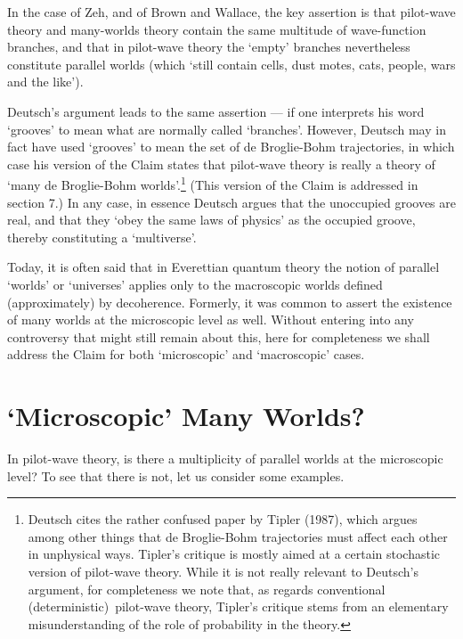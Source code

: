 \documentclass[12pt]{article}%
\begin{document}
In the case of Zeh, and of Brown and Wallace, the key assertion is that
pilot-wave theory and many-worlds theory contain the same multitude of
wave-function branches, and that in pilot-wave theory the `empty' branches
nevertheless constitute parallel worlds (which `still contain cells, dust
motes, cats, people, wars and the like').

Deutsch's argument leads to the same assertion --- if one interprets his word
`grooves' to mean what are normally called `branches'. However, Deutsch may in
fact have used `grooves' to mean the set of de Broglie-Bohm trajectories, in
which case his version of the Claim states that pilot-wave theory is really a
theory of `many de Broglie-Bohm worlds'.\footnote{Deutsch cites the rather
confused paper by Tipler (1987), which argues among other things that de
Broglie-Bohm trajectories must affect each other in unphysical ways. Tipler's
critique is mostly aimed at a certain stochastic version of pilot-wave theory.
While it is not really relevant to Deutsch's argument, for completeness we
note that, as regards conventional (deterministic)\ pilot-wave theory,
Tipler's critique stems from an elementary misunderstanding of the role of
probability in the theory.} (This version of the Claim is addressed in section
7.) In any case, in essence Deutsch argues that the unoccupied grooves are
real, and that they `obey the same laws of physics' as the occupied groove,
thereby constituting a `multiverse'.

Today, it is often said that in Everettian quantum theory the notion of
parallel `worlds' or `universes' applies only to the macroscopic worlds
defined (approximately) by decoherence. Formerly, it was common to assert the
existence of many worlds at the microscopic level as well. Without entering
into any controversy that might still remain about this, here for completeness
we shall address the Claim for both `microscopic' and `macroscopic' cases.

\section{`Microscopic' Many Worlds?}

In pilot-wave theory, is there a multiplicity of parallel worlds at the
microscopic level? To see that there is not, let us consider some examples.
\end{document}
